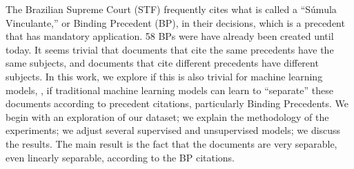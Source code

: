 The Brazilian Supreme Court (STF) frequently cites what is called a ``Súmula Vinculante,'' or Binding Precedent (BP), in their decisions, which is a precedent that has mandatory application. 58 BPs were have already been created until today. It seems trivial that documents that cite the same precedents have the same subjects, and documents that cite different precedents have different subjects. In this work, we explore if this is also trivial for machine learning models, \ie, if traditional machine learning models can learn to ``separate'' these documents according to precedent citations, particularly Binding Precedents. We begin with an exploration of our dataset; we explain the methodology of the experiments; we adjust several supervised and unsupervised models; we discuss the results. The main result is the fact that the documents are very separable, even linearly separable, according to the BP citations.